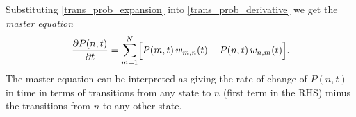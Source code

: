 \documentclass[12pt]{article}
\numberwithin{equation}{section} %
\begin{document}
Substituting \eqref{trans_prob_expansion} into \eqref{trans_prob_derivative} we get the \textit{master equation}
\begin{equation}
\frac{\partial P(n, t)}{\partial t} = \sum_{m=1}^N \Bigl[ P(m, t)\,w_{m,n}(t) - P(n,t)\,w_{n,m}(t)\Bigr].
\end{equation}
The master equation can be interpreted as giving the rate of change of $P(n,t)$ in time in terms of transitions from any state to $n$ (first term in the RHS) minus the transitions from $n$ to any other state.
\end{document}
